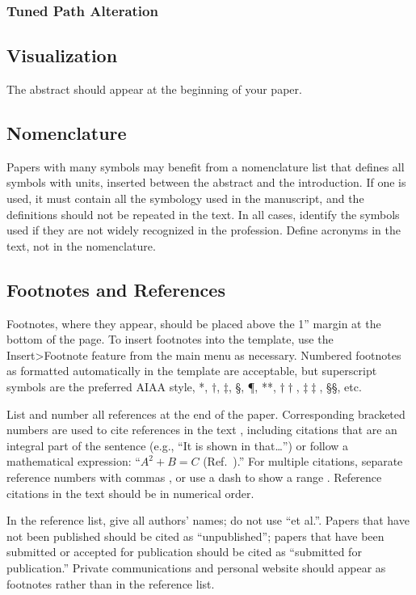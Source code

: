 \documentclass[conf]{new-aiaa}
\begin{document}
\subsubsection{Tuned Path Alteration}


\subsection{Visualization}
The abstract should appear at the beginning of your paper. 

\subsection{Nomenclature}
Papers with many symbols may benefit from a nomenclature list that defines all symbols with units, inserted between the abstract and the introduction. If one is used, it must contain all the symbology used in the manuscript, and the definitions should not be repeated in the text. In all cases, identify the symbols used if they are not widely recognized in the profession. Define acronyms in the text, not in the nomenclature.

\subsection{Footnotes and References}
Footnotes, where they appear, should be placed above the 1'' margin at the bottom of the page. To insert footnotes into the template, use the Insert>Footnote feature from the main menu as necessary. Numbered footnotes as formatted automatically in the template are acceptable, but superscript  symbols are the preferred AIAA style, *, $\dag$, $\ddag$, \S, \P, **, $\dag\dag$, $\ddag\ddag$, \S\S, etc.

List and number all references at the end of the paper. Corresponding bracketed numbers are used to cite references in the text \cite{vatistas1986reverse}, including citations that are an integral part of the sentence (e.g., ``It is shown in \cite{dornheim1996planetary} that\ldots '') or follow a mathematical expression: ``$A^{2} + B = C$ (Ref.~\cite{terster1997nasa}).'' For multiple citations, separate reference numbers with commas \cite{peyret2012computational,oates1997aerothermodynamics}, or use a dash to show a range \cite{volpe1994techniques,thompsonspacecraft,chi1993fluid}. Reference citations in the text should be in numerical order.

In the reference list, give all authors' names; do not use ``et al.''. Papers that have not been published should be cited as ``unpublished''; papers that have been submitted or accepted for publication should be cited as ``submitted for publication.'' Private communications and personal website should appear as footnotes rather than in the reference list.
\end{document}
